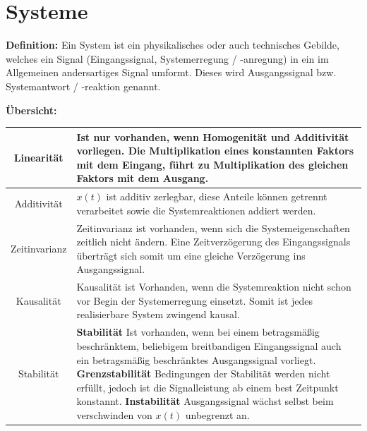 \newpage
\begin{landscape}
	\begin{center}
		
	\end{center}
\end{landscape}

\section{Systeme}
\textbf{Definition:} Ein System ist ein physikalisches oder auch technisches Gebilde, welches ein
Signal (Eingangssignal, Systemerregung / -anregung) in ein im Allgemeinen andersartiges Signal
umformt. Dieses wird Ausgangssignal bzw. Systemantwort / -reaktion genannt.

\begin{center}
	
\end{center}

\textbf{Übersicht:}
\newline
\begin{tabularx}{\textwidth}{|c|X|}\hline
	Linearität	& Ist nur vorhanden, wenn Homogenität und Additivität vorliegen. \newline Die
	Multiplikation eines konstannten Faktors mit dem Eingang, führt zu Multiplikation des
	gleichen Faktors mit dem Ausgang.\\\hline
	
	Additivität & \(x\left(t\right)\) ist additiv zerlegbar, diese Anteile können getrennt verarbeitet
	sowie die Systemreaktionen addiert werden.\\\hline
	
	Zeitinvarianz & Zeitinvarianz ist vorhanden, wenn sich die Systemeigenschaften zeitlich nicht
	ändern. \newline Eine Zeitverzögerung des Eingangssignals überträgt sich somit um eine gleiche
	Verzögerung ins Ausgangssignal.\\\hline
	
	Kausalität & Kausalität ist Vorhanden, wenn die Systemreaktion nicht schon vor Begin der
	Systemerregung einsetzt. \newline Somit ist jedes realisierbare System zwingend kausal.\\\hline
	
	Stabilität & 	\textbf{Stabilität} \newline
					Ist vorhanden, wenn bei einem betragsmäßig beschränktem, beliebigem breitbandigen
					Eingangssignal auch ein betragsmäßig beschränktes Ausgangssignal vorliegt.
					\newline \textbf{Grenzstabilität} \newline
					Bedingungen der Stabilität werden nicht erfüllt, jedoch ist die Signalleistung ab einem best
					Zeitpunkt konstannt. 
					\newline \textbf{Instabilität} \newline
					Ausgangssignal wächst selbst beim verschwinden von \(x\left(t\right)\) unbegrenzt an.
					\\\hline		
\end{tabularx}

